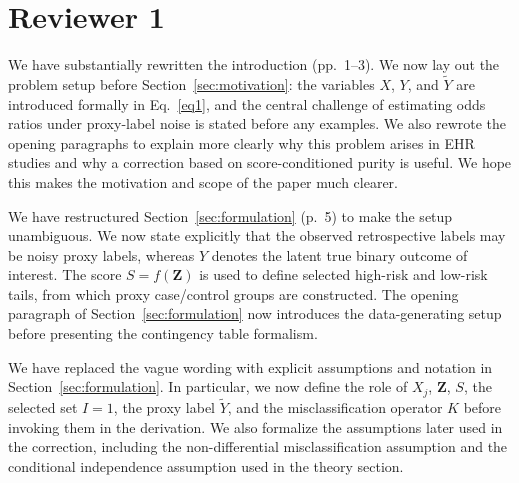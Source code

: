 \documentclass[onecolumn,11pt]{IEEEtran}
\begin{document}
\section*{Reviewer 1}

We have substantially rewritten the introduction (pp.~1--3). We now lay out the problem setup before Section~\ref{sec:motivation}: the variables $X$, $Y$, and $\tilde Y$ are introduced formally in Eq.~\eqref{eq1}, and the central challenge of estimating odds ratios under proxy-label noise is stated before any examples. We also rewrote the opening paragraphs to explain more clearly why this problem arises in EHR studies and why a correction based on score-conditioned purity is useful. We hope this makes the motivation and scope of the paper much clearer.

We have restructured Section~\ref{sec:formulation} (p.~5) to make the setup unambiguous. We now state explicitly that the observed retrospective labels may be noisy proxy labels, whereas $Y$ denotes the latent true binary outcome of interest. The score $S=f(\mathbf{Z})$ is used to define selected high-risk and low-risk tails, from which proxy case/control groups are constructed. The opening paragraph of Section~\ref{sec:formulation} now introduces the data-generating setup before presenting the contingency table formalism. 

We have replaced the vague wording with explicit assumptions and notation in Section~\ref{sec:formulation}. In particular, we now define the role of $X_j$, $\mathbf{Z}$, $S$, the selected set $I=1$, the proxy label $\tilde Y$, and the misclassification operator $K$ before invoking them in the derivation. We also formalize the assumptions later used in the correction, including the non-differential misclassification assumption and the conditional independence assumption used in the theory section.

\end{document}
